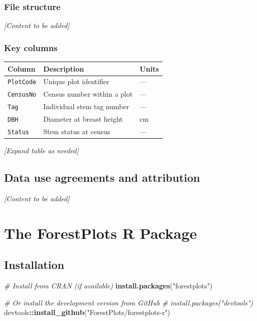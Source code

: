 \documentclass[
]{book}
\newenvironment{Shaded}{\begin{snugshade}}{\end{snugshade}}
\newcommand{\CommentTok}[1]{\textcolor[rgb]{0.56,0.35,0.01}{\textit{#1}}}
\newcommand{\FunctionTok}[1]{\textcolor[rgb]{0.13,0.29,0.53}{\textbf{#1}}}
\newcommand{\NormalTok}[1]{#1}
\newcommand{\SpecialCharTok}[1]{\textcolor[rgb]{0.81,0.36,0.00}{\textbf{#1}}}
\newcommand{\StringTok}[1]{\textcolor[rgb]{0.31,0.60,0.02}{#1}}
\newcounter{none} %
\begin{document}
\subsection{File structure}\label{file-structure}

\emph{{[}Content to be added{]}}

\subsection{Key columns}\label{key-columns}

{\def\LTcaptype{none} %
\begin{longtable}[]{@{}lll@{}}
\toprule\noalign{}
Column & Description & Units \\
\midrule\noalign{}
\endhead
\bottomrule\noalign{}
\endlastfoot
\texttt{PlotCode} & Unique plot identifier & --- \\
\texttt{CensusNo} & Census number within a plot & --- \\
\texttt{Tag} & Individual stem tag number & --- \\
\texttt{DBH} & Diameter at breast height & cm \\
\texttt{Status} & Stem status at census & --- \\
\end{longtable}
}

\emph{{[}Expand table as needed{]}}

\section{Data use agreements and attribution}\label{data-use-agreements-and-attribution}

\emph{{[}Content to be added{]}}

\chapter{The ForestPlots R Package}\label{r-package}

\section{Installation}\label{installation}

\begin{Shaded}
\begin{Highlighting}[]
\CommentTok{\# Install from CRAN (if available)}
\FunctionTok{install.packages}\NormalTok{(}\StringTok{"forestplots"}\NormalTok{)}

\CommentTok{\# Or install the development version from GitHub}
\CommentTok{\# install.packages("devtools")}
\NormalTok{devtools}\SpecialCharTok{::}\FunctionTok{install\_github}\NormalTok{(}\StringTok{"ForestPlots/forestplots{-}r"}\NormalTok{)}
\end{Highlighting}
\end{Shaded}
\end{document}
